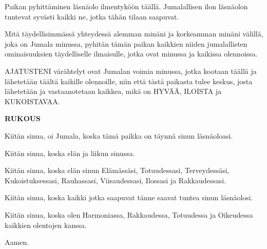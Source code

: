 \begin{passage}[FI]{Paikan pyhittäminen}
    läsnäolo ilmentyköön täällä. Jumalallisen ilon
    läsnäolon tuntevat syvästi kaikki ne, jotka tähän
    tilaan saapuvat.
    \par
    Mitä täydellisimmässä yhteydessä alemman minäni ja
    korkeamman minäni välillä, joka on Jumala minussa,
    pyhitän tämän paikan kaikkien niiden jumalallisten
    ominaisuuksien täydelliselle ilmaisulle, jotka ovat
    minussa ja kaikissa olennoissa.
    \par
    AJATUSTENI värähtelyt ovat Jumalan voimia minussa,
    jotka kootaan täällä ja lähetetään täältä kaikille
    olennoille, niin että tästä paikasta tulee keskus,
    josta lähetetään ja vastaanotetaan kaikkea, mikä on
    HYVÄÄ, ILOISTA ja KUKOISTAVAA.
    \par
    \vspace{1ex}
    \textbf{RUKOUS}
    \par
    Kiitän sinua, oi Jumala, koska tämä paikka on täynnä
    sinun läsnäoloasi.
    \par
    Kiitän sinua, koska elän ja liikun sinussa.
    \par
    Kiitän sinua, koska elän sinun Elämässäsi, Totuudessasi,
    Terveydessäsi, Kukoistuksessasi, Rauhassasi,
    Viisaudessasi, Ilossasi ja Rakkaudessasi.
    \par
    Kiitän sinua, koska kaikki jotka saapuvat tänne saavat
    tuntea sinun läsnäolosi.
    \par
    Kiitän sinua, koska olen Harmoniassa, Rakkaudessa,
    Totuudessa ja Oikeudessa kaikkien olentojen kanssa.
    \par
    Aamen.
  \end{passage}
\endsong









